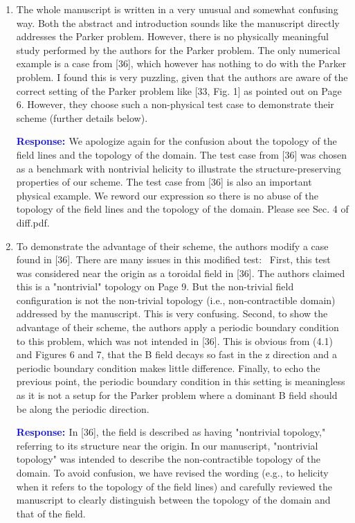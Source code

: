 \documentclass{article}
\theoremstyle{definition}
\newcommand{\rv}[1]{%
  \colorbox{gray!20}{%
    \parbox{0.96\linewidth}{%
      \small #1
    }%
  }%
}
\newcommand{\rp}{\textbf{\textcolor{blue}{Response: }}}
\begin{document}
\begin{enumerate}
\item \rv{The whole manuscript is written in a very unusual and somewhat confusing way. Both the abstract and introduction sounds like the manuscript directly addresses the Parker problem. However, there is no physically meaningful study performed by the authors for the Parker problem. The only numerical example is a case from [36], which however has nothing to do with the Parker problem. I found this is very puzzling, given that the authors are aware of the correct setting of the Parker problem like [33, Fig. 1] as pointed out on Page 6. However, they choose such a non-physical test case to demonstrate their scheme (further details below).}

\rp We apologize again for the confusion about the topology of the field lines and the topology of the domain. The test case from [36] was chosen as a benchmark with nontrivial helicity to illustrate the structure-preserving properties of our scheme. The test case from [36] is also an important physical example. We reword our expression so there is no abuse of the topology of the field lines and the topology of the domain. Please see Sec. 4 of diff.pdf. 

\item \rv{To demonstrate the advantage of their scheme, the authors modify a case found in [36]. There are many issues in this modified test:   
First, this test was considered near the origin as a toroidal field in [36]. The authors claimed this is a "nontrivial" topology on Page 9. But the non-trivial field configuration is not the non-trivial topology (i.e., non-contractible domain) addressed by the manuscript. This is very confusing. Second, to show the advantage of their scheme, the authors apply a periodic boundary condition to this problem, which was not intended in [36]. This is obvious from (4.1) and Figures 6 and 7, that the B field decays so fast in the z direction and a periodic boundary condition makes little difference. Finally, to echo the previous point, the periodic boundary condition in this setting is meaningless as it is not a setup for the Parker problem where a dominant B field should be along the periodic direction.}

\rp In [36], the field is described as having "nontrivial topology," referring to its structure near the origin. In our manuscript, "nontrivial topology" was intended to describe the non-contractible topology of the domain. To avoid confusion, we have revised the wording (e.g., to helicity when it refers to the topology of the field lines) and carefully reviewed the manuscript to clearly distinguish between the topology of the domain and that of the field.  


\end{enumerate}
\end{document}
